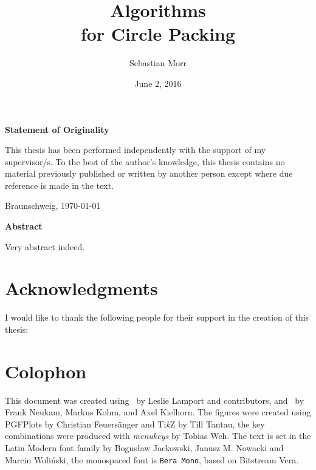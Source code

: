 \documentclass[%
    a4paper,              %
    style=print,          %
    bibliography=totoc,   %
    nexus,                %
    lnum,                 %
    extramargin,          %
]{tubsbook}
\title{Algorithms\\for Circle Packing}
\author{\sffamily\LARGE Sebastian Morr}
\date{\large June 2, 2016}
\begin{document}
\frontmatter %

\maketitle
\cleardoublepage

\thispagestyle{plain} %
\vspace*{7cm}
\centerline{\bfseries Statement of Originality}
\vspace*{1em}
\noindent
This thesis has been performed independently with the support of my supervisor/s.
To the best of the author's knowledge, this thesis contains no material previously
published or written by another person except where due reference is made in the text.

\par
  \bigskip\noindent Braunschweig, \today \par
  \vspace*{10mm}
  \hfill\hrulefill
\cleardoublepage

\thispagestyle{plain} %
\centerline{\bfseries Abstract}
\vspace*{1em}
\noindent
Very abstract indeed.
\cleardoublepage

%

\section*{Acknowledgments}

I would like to thank the following people for their support in the creation of this thesis:

\section*{Colophon}

This document was created using \LaTeXe\ by Leslie Lamport and contributors, and \KOMAScript\ by Frank Neukam, Markus Kohm, and Axel Kielhorn. The figures were created using PGFPlots by Christian Feuersänger and Ti\textit{k}Z by Till Tantau, the key combinations were produced with \emph{menukeys} by Tobias Weh. The text is set in the Latin Modern font family by Bogusław Jackowski, Janusz M. Nowacki and Marcin Woliński, the monospaced font is \texttt{Bera Mono}, based on Bitstream Vera.

\cleardoublepage
\setcounter{tocdepth}{2}
\end{document}
